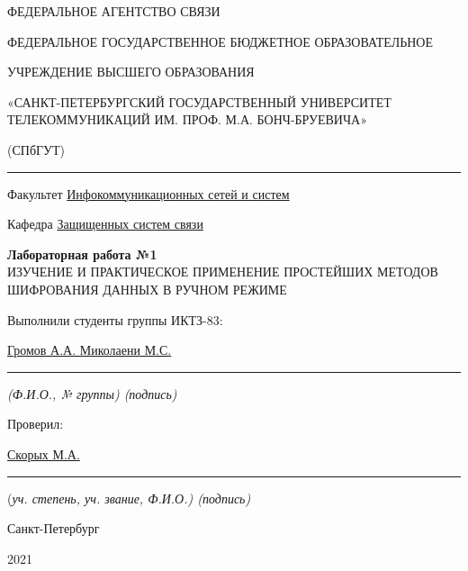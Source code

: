 \documentclass[a4paper,14pt]{extarticle}
\begin{document}
    \begin{center}
        \thispagestyle{empty}
        \begin{singlespace}
        ФЕДЕРАЛЬНОЕ АГЕНТСТВО СВЯЗИ

        ФЕДЕРАЛЬНОЕ ГОСУДАРСТВЕННОЕ БЮДЖЕТНОЕ ОБРАЗОВАТЕЛЬНОЕ

        УЧРЕЖДЕНИЕ ВЫСШЕГО ОБРАЗОВАНИЯ

        «САНКТ-ПЕТЕРБУРГСКИЙ ГОСУДАРСТВЕННЫЙ УНИВЕРСИТЕТ ТЕЛЕКОММУНИКАЦИЙ ИМ. ПРОФ. М.А. БОНЧ-БРУЕВИЧА»

        (СПбГУТ)
        \end{singlespace}
        \vspace{-1ex}
        \rule{\textwidth}{0.4pt}
        \vspace{-5ex}

        Факультет \underline{Инфокоммуникационных сетей и систем}

        Кафедра \underline{Защищенных систем связи}
        \vspace{10ex}

        \textbf{Лабораторная работа №1}\\
        ИЗУЧЕНИЕ И ПРАКТИЧЕСКОЕ ПРИМЕНЕНИЕ ПРОСТЕЙШИХ МЕТОДОВ ШИФРОВАНИЯ ДАННЫХ В РУЧНОМ РЕЖИМЕ


    \end{center}
    \vspace{4ex}
    \begin{flushright}
    \parbox{10 cm}{
    \begin{flushleft}
        Выполнили студенты группы ИКТЗ-83:

        \underline{Громов А.А. Миколаени М.С.} \hfill \rule[-0.85ex]{0.1\textwidth}{0.6pt}

        \footnotesize \textit{ (Ф.И.О., № группы) \hfill (подпись)} \normalsize

        Проверил:

        \underline{Скорых М.А.} \hfill \rule[-0.85ex]{0.1\textwidth}{0.6pt}

        (\footnotesize \textit{уч. степень, уч. звание, Ф.И.О.) \hfill (подпись)} \normalsize

    \end{flushleft}
    }
    \end{flushright}
    \begin{center}
        \vfill
        Санкт-Петербург

        2021

    \end{center}
    \newpage
\end{document}
